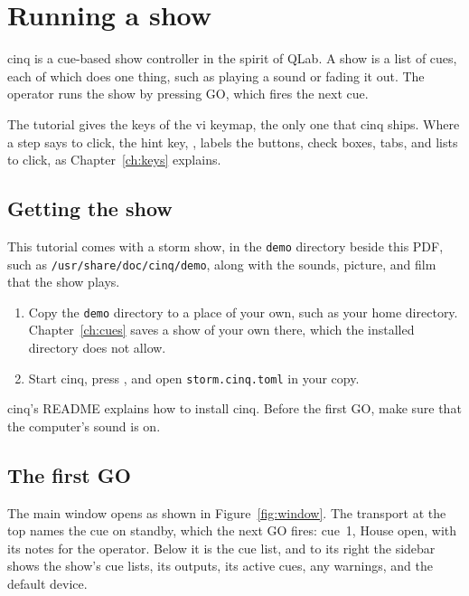 %

\chapter{Running a show}
\label{ch:running}

cinq is a cue-based show controller in the spirit of QLab.  A show is a list
of cues, each of which does one thing, such as playing a sound or fading it
out.  The operator runs the show by pressing GO, which fires the next cue.

The tutorial gives the keys of the vi keymap, the only one that cinq ships.
Where a step says to click, the hint key, , labels the buttons,
check boxes, tabs, and lists to click, as Chapter~\ref{ch:keys} explains.

\section{Getting the show}

This tutorial comes with a storm show, in the \texttt{demo} directory beside
this PDF, such as \texttt{/usr/share/doc/cinq/demo}, along with the sounds,
picture, and film that the show plays.

\begin{enumerate}
\item Copy the \texttt{demo} directory to a place of your own, such as your
  home directory.  Chapter~\ref{ch:cues} saves a show of your own there,
  which the installed directory does not allow.
\item Start cinq, press , and open \texttt{storm.cinq.toml}
  in your copy.
\end{enumerate}

cinq's README explains how to install cinq.  Before the first GO, make sure
that the computer's sound is on.

\section{The first GO}

The main window opens as shown in Figure~\ref{fig:window}.  The transport at
the top names the cue on standby, which the next GO fires: cue~1, House open,
with its notes for the operator.  Below it is the cue list, and to its right
the sidebar shows the show's cue lists, its outputs, its active cues, any
warnings, and the default device.

